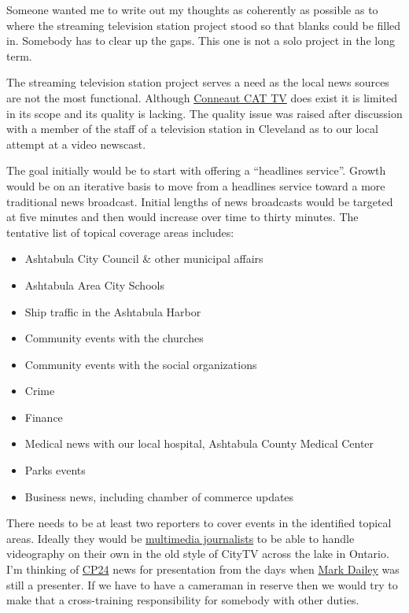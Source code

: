 Someone wanted me to write out my thoughts as coherently as possible as
to where the streaming television station project stood so that blanks
could be filled in. Somebody has to clear up the gaps. This one is not a
solo project in the long term.

The streaming television station project serves a need as the local news
sources are not the most functional. Although
\href{https://vimeo.com/user126359532}{Conneaut CAT TV} does exist it is
limited in its scope and its quality is lacking. The quality issue was
raised after discussion with a member of the staff of a television
station in Cleveland as to our local attempt at a video newscast.

The goal initially would be to start with offering a ``headlines
service''. Growth would be on an iterative basis to move from a
headlines service toward a more traditional news broadcast. Initial
lengths of news broadcasts would be targeted at five minutes and then
would increase over time to thirty minutes. The tentative list of
topical coverage areas includes:

\begin{itemize}
\tightlist
\item
  Ashtabula City Council \& other municipal affairs
\item
  Ashtabula Area City Schools
\item
  Ship traffic in the Ashtabula Harbor
\item
  Community events with the churches
\item
  Community events with the social organizations
\item
  Crime
\item
  Finance
\item
  Medical news with our local hospital, Ashtabula County Medical Center
\item
  Parks events
\item
  Business news, including chamber of commerce updates
\end{itemize}

There needs to be at least two reporters to cover events in the
identified topical areas. Ideally they would be
\href{https://en.wikipedia.org/w/index.php?title=Multimedia_journalism&oldid=1131239568}{multimedia
journalists} to be able to handle videography on their own in the old
style of CityTV across the lake in Ontario. I'm thinking of
\href{https://en.wikipedia.org/w/index.php?title=CP24&oldid=1138757831}{CP24}
news for presentation from the days when
\href{https://en.wikipedia.org/w/index.php?title=Mark_Dailey&oldid=1124036072}{Mark
Dailey} was still a presenter. If we have to have a cameraman in reserve
then we would try to make that a cross-training responsibility for
somebody with other duties.

